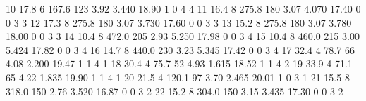 \documentclass[
]{book}
\newenvironment{Shaded}{\begin{snugshade}}{\end{snugshade}}
\newcommand{\DecValTok}[1]{\textcolor[rgb]{0.00,0.00,0.81}{#1}}
\newcommand{\FloatTok}[1]{\textcolor[rgb]{0.00,0.00,0.81}{#1}}
\begin{document}
\begin{Shaded}
\begin{Highlighting}[]
\DecValTok{10}  \FloatTok{17.8}    \DecValTok{6}  \FloatTok{167.6}  \DecValTok{123}        \FloatTok{3.92}  \FloatTok{3.440}  \FloatTok{18.90}   \DecValTok{1}   \DecValTok{0}     \DecValTok{4}     \DecValTok{4}
\DecValTok{11}  \FloatTok{16.4}    \DecValTok{8}  \FloatTok{275.8}  \DecValTok{180}        \FloatTok{3.07}  \FloatTok{4.070}  \FloatTok{17.40}   \DecValTok{0}   \DecValTok{0}     \DecValTok{3}     \DecValTok{3}
\DecValTok{12}  \FloatTok{17.3}    \DecValTok{8}  \FloatTok{275.8}  \DecValTok{180}        \FloatTok{3.07}  \FloatTok{3.730}  \FloatTok{17.60}   \DecValTok{0}   \DecValTok{0}     \DecValTok{3}     \DecValTok{3}
\DecValTok{13}  \FloatTok{15.2}    \DecValTok{8}  \FloatTok{275.8}  \DecValTok{180}        \FloatTok{3.07}  \FloatTok{3.780}  \FloatTok{18.00}   \DecValTok{0}   \DecValTok{0}     \DecValTok{3}     \DecValTok{3}
\DecValTok{14}  \FloatTok{10.4}    \DecValTok{8}  \FloatTok{472.0}  \DecValTok{205}        \FloatTok{2.93}  \FloatTok{5.250}  \FloatTok{17.98}   \DecValTok{0}   \DecValTok{0}     \DecValTok{3}     \DecValTok{4}
\DecValTok{15}  \FloatTok{10.4}    \DecValTok{8}  \FloatTok{460.0}  \DecValTok{215}        \FloatTok{3.00}  \FloatTok{5.424}  \FloatTok{17.82}   \DecValTok{0}   \DecValTok{0}     \DecValTok{3}     \DecValTok{4}
\DecValTok{16}  \FloatTok{14.7}    \DecValTok{8}  \FloatTok{440.0}  \DecValTok{230}        \FloatTok{3.23}  \FloatTok{5.345}  \FloatTok{17.42}   \DecValTok{0}   \DecValTok{0}     \DecValTok{3}     \DecValTok{4}
\DecValTok{17}  \FloatTok{32.4}    \DecValTok{4}   \FloatTok{78.7}   \DecValTok{66}        \FloatTok{4.08}  \FloatTok{2.200}  \FloatTok{19.47}   \DecValTok{1}   \DecValTok{1}     \DecValTok{4}     \DecValTok{1}
\DecValTok{18}  \FloatTok{30.4}    \DecValTok{4}   \FloatTok{75.7}   \DecValTok{52}        \FloatTok{4.93}  \FloatTok{1.615}  \FloatTok{18.52}   \DecValTok{1}   \DecValTok{1}     \DecValTok{4}     \DecValTok{2}
\DecValTok{19}  \FloatTok{33.9}    \DecValTok{4}   \FloatTok{71.1}   \DecValTok{65}        \FloatTok{4.22}  \FloatTok{1.835}  \FloatTok{19.90}   \DecValTok{1}   \DecValTok{1}     \DecValTok{4}     \DecValTok{1}
\DecValTok{20}  \FloatTok{21.5}    \DecValTok{4}  \FloatTok{120.1}   \DecValTok{97}        \FloatTok{3.70}  \FloatTok{2.465}  \FloatTok{20.01}   \DecValTok{1}   \DecValTok{0}     \DecValTok{3}     \DecValTok{1}
\DecValTok{21}  \FloatTok{15.5}    \DecValTok{8}  \FloatTok{318.0}  \DecValTok{150}        \FloatTok{2.76}  \FloatTok{3.520}  \FloatTok{16.87}   \DecValTok{0}   \DecValTok{0}     \DecValTok{3}     \DecValTok{2}
\DecValTok{22}  \FloatTok{15.2}    \DecValTok{8}  \FloatTok{304.0}  \DecValTok{150}        \FloatTok{3.15}  \FloatTok{3.435}  \FloatTok{17.30}   \DecValTok{0}   \DecValTok{0}     \DecValTok{3}     \DecValTok{2}

\end{Highlighting}
\end{Shaded}
\end{document}
